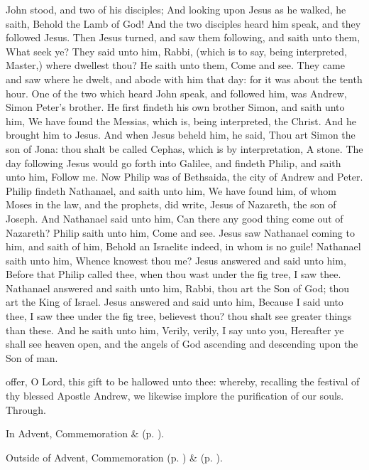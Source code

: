  John stood, and two of his disciples; And looking upon Jesus as he walked, he saith, Behold the Lamb of God! And the two disciples heard him speak, and they followed Jesus. Then Jesus turned, and saw them following, and saith unto them, What seek ye? They said unto him, Rabbi, (which is to say, being interpreted, Master,) where dwellest thou? He saith unto them, Come and see. They came and saw where he dwelt, and abode with him that day: for it was about the tenth hour. One of the two which heard John speak, and followed him, was Andrew, Simon Peter's brother. He first findeth his own brother Simon, and saith unto him, We have found the Messias, which is, being interpreted, the Christ. And he brought him to Jesus. And when Jesus beheld him, he said, Thou art Simon the son of Jona: thou shalt be called Cephas, which is by interpretation, A stone. The day following Jesus would go forth into Galilee, and findeth Philip, and saith unto him, Follow me. Now Philip was of Bethsaida, the city of Andrew and Peter. Philip findeth Nathanael, and saith unto him, We have found him, of whom Moses in the law, and the prophets, did write, Jesus of Nazareth, the son of Joseph. And Nathanael said unto him, Can there any good thing come out of Nazareth? Philip saith unto him, Come and see. Jesus saw Nathanael coming to him, and saith of him, Behold an Israelite indeed, in whom is no guile! Nathanael saith unto him, Whence knowest thou me? Jesus answered and said unto him, Before that Philip called thee, when thou wast under the fig tree, I saw thee. Nathanael answered and saith unto him, Rabbi, thou art the Son of God; thou art the King of Israel. Jesus answered and said unto him, Because I said unto thee, I saw thee under the fig tree, believest thou? thou shalt see greater things than these. And he saith unto him, Verily, verily, I say unto you, Hereafter ye shall see heaven open, and the angels of God ascending and descending upon the Son of man.


\secret
{} offer, O Lord, this gift to be hallowed unto thee: whereby, recalling the festival of thy blessed Apostle Andrew, we likewise implore the purification of our souls. Through.

\begin{rubric}
	In Advent, Commemoration  \&  (p. \pageref{SaturninusSecret}).
\end{rubric}
\begin{rubric}
	Outside of Advent, Commemoration  (p. \pageref{SaturninusSecret}) \&  (p. \pageref{SPMaryInEaster}).
\end{rubric}

